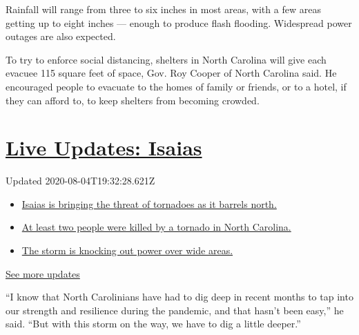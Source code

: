 Rainfall will range from three to six inches in most areas, with a few
areas getting up to eight inches --- enough to produce flash flooding.
Widespread power outages are also expected.

To try to enforce social distancing, shelters in North Carolina will
give each evacuee 115 square feet of space, Gov. Roy Cooper of North
Carolina said. He encouraged people to evacuate to the homes of family
or friends, or to a hotel, if they can afford to, to keep shelters from
becoming crowded.

\hypertarget{live-updates-isaias}{%
\section{\texorpdfstring{\href{https://www.nytimes.com/2020/08/04/us/isaias-storm-updates.html?action=click\&pgtype=Article\&state=default\&region=MAIN_CONTENT_1\&context=storylines_live_updates}{Live
Updates: Isaias}}{Live Updates: Isaias}}\label{live-updates-isaias}}

Updated 2020-08-04T19:32:28.621Z

\begin{itemize}
\tightlist
\item
  \href{https://www.nytimes.com/2020/08/04/us/isaias-storm-updates.html?action=click\&pgtype=Article\&state=default\&region=MAIN_CONTENT_1\&context=storylines_live_updates\#link-362830dd}{Isaias
  is bringing the threat of tornadoes as it barrels north.}
\item
  \href{https://www.nytimes.com/2020/08/04/us/isaias-storm-updates.html?action=click\&pgtype=Article\&state=default\&region=MAIN_CONTENT_1\&context=storylines_live_updates\#link-7961bdbc}{At
  least two people were killed by a tornado in North Carolina.}
\item
  \href{https://www.nytimes.com/2020/08/04/us/isaias-storm-updates.html?action=click\&pgtype=Article\&state=default\&region=MAIN_CONTENT_1\&context=storylines_live_updates\#link-34e5d4e4}{The
  storm is knocking out power over wide areas.}
\end{itemize}

\href{https://www.nytimes.com/2020/08/04/us/isaias-storm-updates.html?action=click\&pgtype=Article\&state=default\&region=MAIN_CONTENT_1\&context=storylines_live_updates}{See
more updates}

``I know that North Carolinians have had to dig deep in recent months to
tap into our strength and resilience during the pandemic, and that
hasn't been easy,'' he said. ``But with this storm on the way, we have
to dig a little deeper.''

